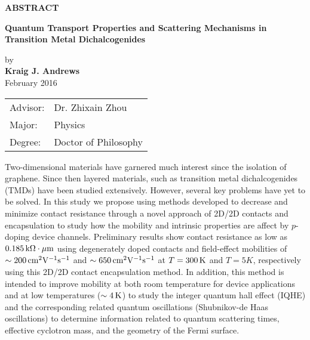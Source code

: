 \begin{center}
\textbf{ABSTRACT}
	
	
	\singlespacing
\textbf{Quantum Transport Properties and Scattering Mechanisms in Transition Metal Dichalcogenides}\\
	\doublespacing
	
	by\\
	
	\textbf{Kraig J. Andrews}\\
	February 2016\\
\end{center}
\begin{tabular}{ll}	
Advisor: & Dr. Zhixain Zhou\\
Major:   &Physics\\
Degree:  &Doctor of Philosophy
\end{tabular}
\bigskip

\noindent Two-dimensional materials have garnered much interest since the isolation of graphene. Since then layered materials, such as transition metal dichalcogenides (TMDs) have been studied extensively. However, several key problems have yet to be solved. In this study we propose using methods developed to decrease and minimize contact resistance through a novel approach of 2D/2D contacts and \hbn encapsulation to study how the mobility and intrinsic properties are affect by $p$-doping  device channels. Preliminary results show contact resistance as low as $0.185\,\mathrm{k\Omega\cdot\mu m}$ using degenerately doped contacts and field-effect mobilities of $\sim 200\,\mathrm{cm}^{2}\mathrm{V}^{-1}\mathrm{s}^{-1}$ and $\sim 650\,\mathrm{cm}^{2}\mathrm{V}^{-1}\mathrm{s}^{-1}$ at $T=300\,\mathrm{K}$ and $T=5{K}$, respectively using this 2D/2D contact \hbn encapsulation method. In addition, this method is intended to improve mobility at both room temperature for device applications and at low temperatures ($\sim 4\,\mathrm{K}$) to study the integer quantum hall effect (IQHE) and the corresponding related quantum oscillations (Shubnikov-de Haas oscillations) to determine information related to quantum scattering times, effective cyclotron mass, and the geometry of the Fermi surface. 
